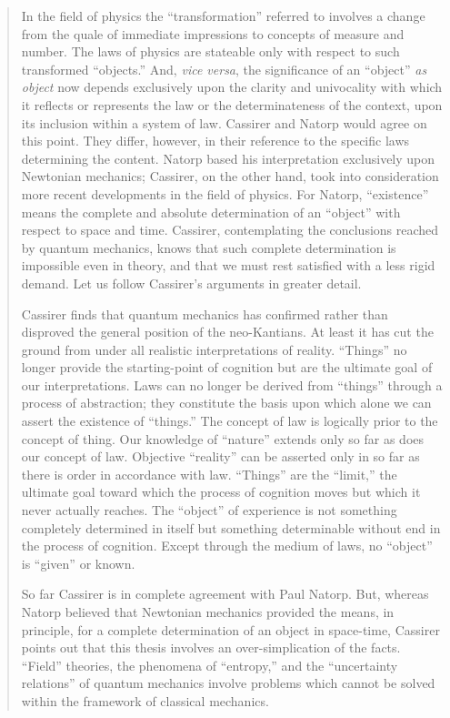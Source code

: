 \begin{quote}
    In the field of physics the ``transformation'' referred to involves a change from the quale of immediate impressions to concepts of measure and number.  The laws of physics are stateable only with respect to such transformed ``objects.''  And, \emph{vice versa}, the significance of an ``object'' \emph{as object} now depends exclusively upon the clarity and univocality with which it reflects or represents the law or the determinateness of the context, upon its inclusion within a system of law.  Cassirer and Natorp would agree on this point.  They differ, however, in their reference to the specific laws determining the content.  Natorp based his interpretation exclusively upon Newtonian mechanics; Cassirer, on the other hand, took into consideration more recent developments in the field of physics.  For Natorp, ``existence'' means the complete and absolute determination of an ``object'' with respect to space and time.  Cassirer, contemplating the conclusions reached by quantum mechanics, knows that such complete determination is impossible even in theory, and that we must rest satisfied with a less rigid demand.  Let us follow Cassirer's arguments in greater detail.  

    Cassirer finds that quantum mechanics has confirmed rather than disproved the general position of the neo-Kantians.  At least it has cut the ground from under all realistic interpretations of reality.  ``Things'' no longer provide the starting-point of cognition but are the ultimate goal of our interpretations.  Laws can no longer be derived from ``things'' through a process of abstraction; they constitute the basis upon which alone we can assert the existence of ``things.''  The concept of law is logically prior to the concept of thing.  Our knowledge of ``nature'' extends only so far as does our concept of law.  Objective ``reality'' can be asserted only in so far as there is order in accordance with law.  ``Things'' are the ``limit,'' the ultimate goal toward which the process of cognition moves but which it never actually reaches.  The ``object'' of experience is not something completely determined in itself but something determinable without end in the process of cognition.  Except through the medium of laws, no ``object'' is ``given'' or known.

    So far Cassirer is in complete agreement with Paul Natorp.  But, whereas Natorp believed that Newtonian mechanics provided the means, in principle, for a complete determination of an object in space-time, Cassirer points out that this thesis involves an over-simplication of the facts.  ``Field'' theories, the phenomena of ``entropy,'' and the ``uncertainty relations'' of quantum mechanics involve problems which cannot be solved within the framework of classical mechanics.


\end{quote}
